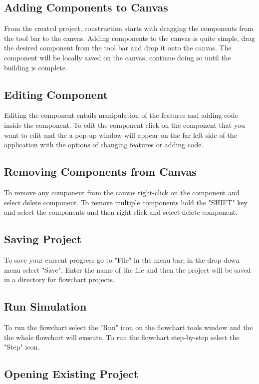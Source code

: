 \documentclass[11pt,a4paper,titlepage]{article}
\begin{document}
		
	\subsection{Adding Components to Canvas}
	
	From the created project, construction starts with dragging the components from the tool bar to the canvas. Adding components to the canvas is quite simple, drag the desired component from the tool bar and drop it onto the canvas. The component will be locally saved on the canvas, continue doing so until the building is complete.
	
	\subsection{Editing Component}
	
	Editing the component entails manipulation of the features and adding code inside the component. To edit the component click on the component that you want to edit and the a pop-up window will appear on the far left side of the application with the options of changing features or adding code.
		
	\subsection{Removing Components from Canvas}
	
	To remove any component from the canvas right-click on the component and select delete component. To remove multiple components hold the "SHIFT" key and select the components and then right-click and select delete component.
		
	\subsection{Saving Project}
	
	To save your current progress go to "File" in the menu bar, in the drop down menu select "Save". Enter the name of the file and then the project will be saved in a directory for flowchart projects.
	
	\subsection{Run Simulation}
	To run the flowchart select the "Run" icon on the flowchart tools window and the the whole flowchart will execute. To run the flowchart step-by-step select the "Step" icon.
	
		
	\subsection{Opening Existing Project}
	
\end{document}
